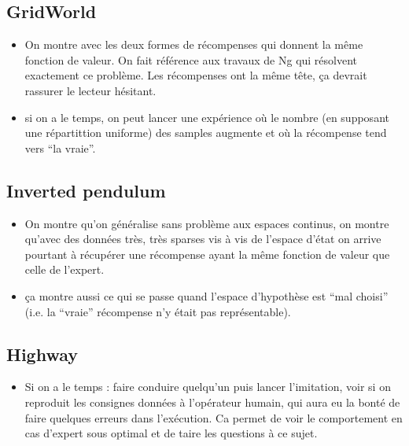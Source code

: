 \documentclass[11pt]{article}
\begin{document}
\subsection{GridWorld}
\label{sec-9-1}

\begin{itemize}
\item On montre avec les deux formes de récompenses qui donnent la même fonction de valeur. On fait référence aux travaux de Ng qui résolvent exactement ce problème. Les récompenses ont la même tête, ça devrait rassurer le lecteur hésitant.
\item si on a le temps, on peut lancer une expérience où le nombre (en supposant une répartittion uniforme) des samples augmente et où la récompense tend vers ``la vraie''.
\end{itemize}
\subsection{Inverted pendulum}
\label{sec-9-2}

\begin{itemize}
\item On montre qu'on généralise sans problème aux espaces continus, on montre qu'avec des données très, très sparses vis à vis de l'espace d'état on arrive pourtant à récupérer une récompense ayant la même fonction de valeur que celle de l'expert.
\item ça montre aussi ce qui se passe quand l'espace d'hypothèse est ``mal choisi'' (i.e. la ``vraie'' récompense n'y était pas représentable).
\end{itemize}
\subsection{Highway}
\label{sec-9-3}

\begin{itemize}
\item Si on a le temps : faire conduire quelqu'un puis lancer l'imitation, voir si on reproduit les consignes données à l'opérateur humain, qui aura eu la bonté de faire quelques erreurs dans l'exécution. Ca permet de voir le comportement en cas d'expert sous optimal et de taire les questions à ce sujet.
\end{itemize}



\end{document}
